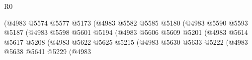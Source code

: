 \begin{lexlean}{R0}
\begin{coremodule}
                                                        (@4983
                                                          @5574
                                                          @5577
                                                          @5173
                                                          (@4983
                                                            @5582
                                                            @5585
                                                            @5180
                                                            (@4983
                                                              @5590
                                                              @5593
                                                              @5187
                                                              (@4983
                                                                @5598
                                                                @5601
                                                                @5194
                                                                (@4983
                                                                  @5606
                                                                  @5609
                                                                  @5201
                                                                  (@4983
                                                                    @5614
                                                                    @5617
                                                                    @5208
                                                                    (@4983
                                                                      @5622
                                                                      @5625
                                                                      @5215
                                                                      (@4983
                                                                        @5630
                                                                        @5633
                                                                        @5222
                                                                        (@4983
                                                                          @5638
                                                                          @5641
                                                                          @5229
                                                                          (@4983

\end{coremodule}
\end{lexlean}
